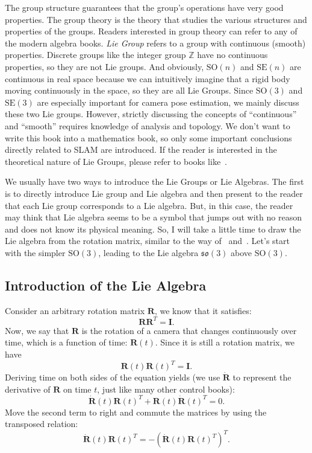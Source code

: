 The group structure guarantees that the group's operations have very good properties. The group theory is the theory that studies the various structures and properties of the groups. Readers interested in group theory can refer to any of the modern algebra books. \textit{Lie Group} refers to a group with continuous (smooth) properties. Discrete groups like the integer group $\mathbb{Z}$ have no continuous properties, so they are not Lie groups. And obviously, $\mathrm{SO}(n)$ and $\mathrm{SE}(n)$ are continuous in real space because we can intuitively imagine that a rigid body moving continuously in the space, so they are all Lie Groups. Since $\mathrm{SO}(3)$ and $\mathrm{SE}(3)$ are especially important for camera pose estimation, we mainly discuss these two Lie groups. However, strictly discussing the concepts of ``continuous'' and ``smooth'' requires knowledge of analysis and topology. We don't want to write this book into a mathematics book, so only some important conclusions directly related to SLAM are introduced. If the reader is interested in the theoretical nature of Lie Groups, please refer to books like~\cite{Varadarajan2013}.

We usually have two ways to introduce the Lie Groups or Lie Algebras. The first is to directly introduce Lie group and Lie algebra and then present to the reader that each Lie group corresponds to a Lie algebra. But, in this case, the reader may think that Lie algebra seems to be a symbol that jumps out with no reason and does not know its physical meaning. So, I will take a little time to draw the Lie algebra from the rotation matrix, similar to the way of~\cite{Ma2012} and~\cite{Sola2012}. Let's start with the simpler $\mathrm{SO}(3)$, leading to the Lie algebra $\mathfrak{so}(3)$ above $\mathrm{SO}(3)$.

\subsection{Introduction of the Lie Algebra}
Consider an arbitrary rotation matrix $\mathbf{R}$, we know that it satisfies:
\begin{equation}
\mathbf{R} \mathbf{R}^T=\mathbf{I}.
\end{equation}
Now, we say that $\mathbf{R}$ is the rotation of a camera that changes continuously over time, which is a function of time: $\mathbf{R}(t)$. Since it is still a rotation matrix, we have
\[
\mathbf{R}(t) \mathbf{R}(t) ^T = \mathbf{I}.
\]
Deriving time on both sides of the equation yields (we use $\dot{\mathbf{R}}$ to represent the derivative of $\mathbf{R}$ on time $t$, just like many other control books):
\[
\dot{\mathbf{R}} (t) \mathbf{R} {(t)^T} + \mathbf{R} (t) \dot{\mathbf{R}} {(t) ^T} = 0.
\]
Move the second term to right and commute the matrices by using the transposed relation:
\begin{equation}
\dot{\mathbf{R}} (t) \mathbf{R} {(t)^T} = - \left( \dot{\mathbf{R}} (t) \mathbf{R} {(t)^T} \right)^T .
\end{equation}

